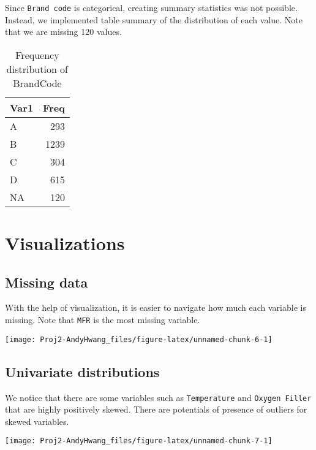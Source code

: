 \documentclass[]{report}
\begin{document}
Since \texttt{Brand\ code} is categorical, creating summary statistics
was not possible. Instead, we implemented table summary of the
distribution of each value. Note that we are missing 120 values.

\begin{table}[H]

\caption{\label{tab:unnamed-chunk-5}Frequency distribution of BrandCode}
\centering
\fontsize{8}{10}\selectfont
\begin{tabular}[t]{lr}
\toprule
\textbf{Var1} & \textbf{Freq}\\
\midrule
\rowcolor{gray!6}  A & 293\\
B & 1239\\
\rowcolor{gray!6}  C & 304\\
D & 615\\
\rowcolor{gray!6}  NA & 120\\
\bottomrule
\end{tabular}
\end{table}

\section{Visualizations}\label{visualizations}

\subsection{Missing data}\label{missing-data}

With the help of visualization, it is easier to navigate how much each
variable is missing. Note that \texttt{MFR} is the most missing
variable.

\begin{center}\texttt{[image: Proj2-AndyHwang\_files/figure-latex/unnamed-chunk-6-1]} \end{center}

\subsection{Univariate distributions}\label{univariate-distributions}

We notice that there are some variables such as \texttt{Temperature} and
\texttt{Oxygen\ Filler} that are highly positively skewed. There are
potentials of presence of outliers for skewed variables.

\begin{center}\texttt{[image: Proj2-AndyHwang\_files/figure-latex/unnamed-chunk-7-1]} \end{center}
\end{document}
